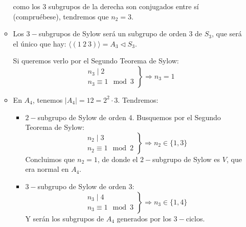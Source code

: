 \begin{ejemplo}
\begin{itemize}
\begin{itemize}
                    como los 3 subgrupos de la derecha son conjugados entre sí (compruébese), tendremos que $n_2 = 3$.

                \item Los $3-$subgrupos de Sylow será un subgrupo de orden 3 de $S_3$, que será el único que hay: $\langle (1\ 2\ 3) \rangle  = A_3 \lhd S_3$. 

                    Si queremos verlo por el Segundo Teorema de Sylow:
                    \begin{equation*}
                        \left.\begin{array}{r}
                            n_3 \mid 2 \\
                            n_3 \equiv 1 \mod 3
                    \end{array}\right\} \Longrightarrow n_3 = 1
                    \end{equation*}
                \item En $A_4$, tenemos $|A_4| = 12 = 2^2 \cdot 3$. Tendremos:
                    \begin{itemize}
                        \item $2-$subgrupo de Sylow de orden 4. Busquemos por el Segundo Teorema de Sylow:
                            \begin{equation*}
                                \left.\begin{array}{r}
                                    n_2 \mid 3 \\
                                    n_2 \equiv 1 \mod 2
                            \end{array}\right\} \Longrightarrow n_2 \in \{1,3\}
                            \end{equation*}
                            Concluimos que $n_2 = 1$, de donde el $2-$subgrupo de Sylow es $V$, que era normal en $A_4$.
                        \item $3-$subgrupo de Sylow de orden 3:
                            \begin{equation*}
                                \left.\begin{array}{r}
                                    n_3 \mid 4 \\
                                    n_3 \equiv 1 \mod 3
                                \end{array}\right\} \Longrightarrow n_3 \in \{1,4\} 
                            \end{equation*}
                            Y serán los subgrupos de $A_4$ generados por los $3-$ciclos.

\end{itemize}
\end{itemize}
\end{itemize}
\end{ejemplo}
